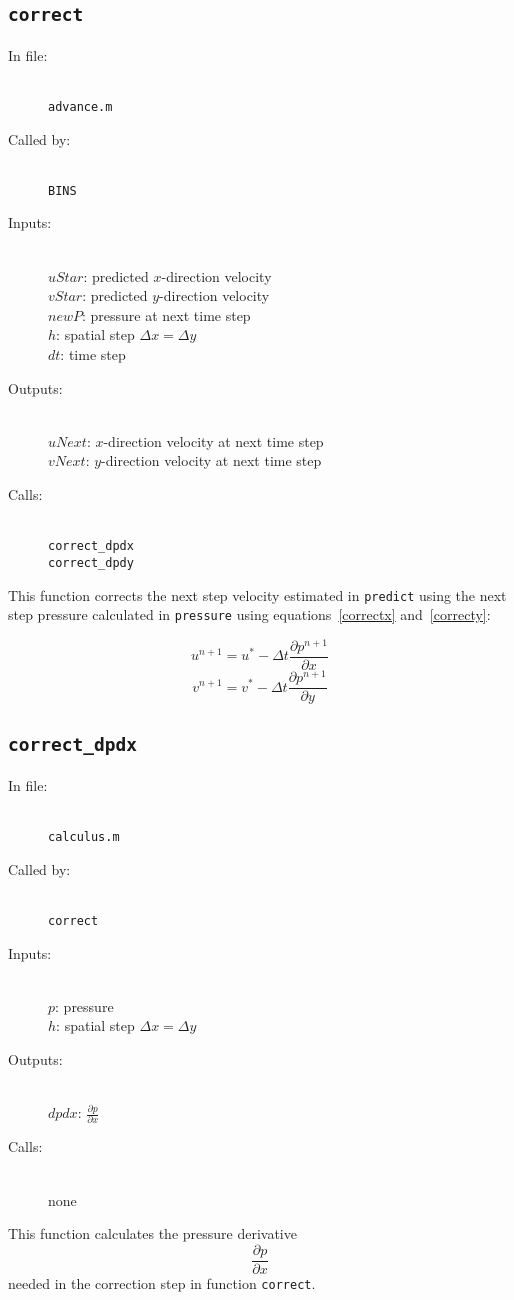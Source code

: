 \documentclass[12pt]{article}
\begin{document}
\subsection{\texttt{correct}}
\begin{description}
\item[In file:] \hfill \\ \texttt{advance.m}
\item[Called by:] \hfill \\ \texttt{BINS}
\item[Inputs:] \hfill \\ $uStar$: predicted $x$-direction velocity \\ $vStar$: predicted $y$-direction velocity \\ $newP$: pressure at next time step \\ $h$: spatial step $\Delta x = \Delta y$ \\ $dt$: time step
\item[Outputs:] \hfill \\ $uNext$: $x$-direction velocity at next time step \\ $vNext$: $y$-direction velocity at next time step
\item[Calls:] \hfill \\ \texttt{correct\_dpdx} \\ \texttt{correct\_dpdy}
\end{description}
This function corrects the next step velocity estimated in \texttt{predict} using the next step pressure calculated in \texttt{pressure} using equations~\ref{correctx} and~\ref{correcty}:

\[ u^{n+1}= u^* - \Delta t\frac{\partial p^{n+1}}{\partial x} \]
\[ v^{n+1}= v^* - \Delta t\frac{\partial p^{n+1}}{\partial y} \]

\subsection{\texttt{correct\_dpdx}}
\begin{description}
\item[In file:] \hfill \\ \texttt{calculus.m}
\item[Called by:] \hfill \\ \texttt{correct}
\item[Inputs:] \hfill \\ $p$: pressure \\ $h$: spatial step $\Delta x = \Delta y$
\item[Outputs:] \hfill \\ $dpdx$: $\frac{\partial p}{\partial x}$
\item[Calls:] \hfill \\ none
\end{description}
This function calculates the pressure derivative
\[ \frac{\partial p}{\partial x}\]
needed in the correction step in function \texttt{correct}.
\end{document}
